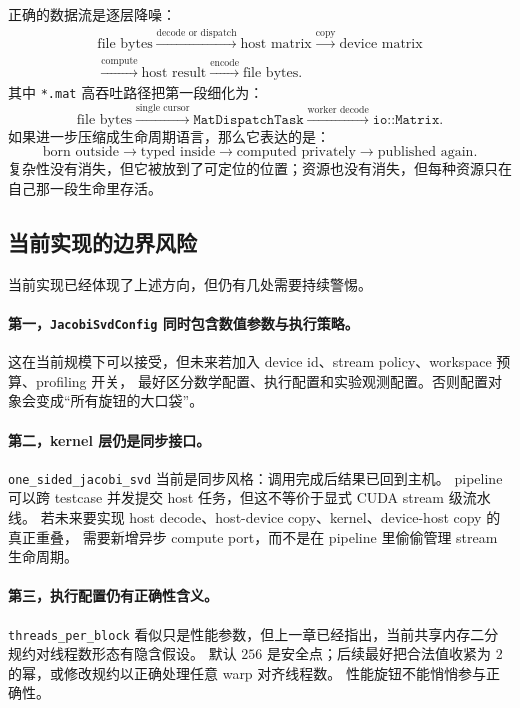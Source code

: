 正确的数据流是逐层降噪：
\[
    \begin{gathered}
        \text{file bytes}
        \xrightarrow{\text{decode or dispatch}}
        \text{host matrix}
        \xrightarrow{\text{copy}}
        \text{device matrix} \\
        \xrightarrow{\text{compute}}
        \text{host result}
        \xrightarrow{\text{encode}}
        \text{file bytes}.
    \end{gathered}
\]
其中 \texttt{*.mat} 高吞吐路径把第一段细化为：
\[
    \text{file bytes}
    \xrightarrow{\text{single cursor}}
    \texttt{MatDispatchTask}
    \xrightarrow{\text{worker decode}}
    \texttt{io::Matrix}.
\]
如果进一步压缩成生命周期语言，那么它表达的是：
\[
    \text{born outside}
    \rightarrow
    \text{typed inside}
    \rightarrow
    \text{computed privately}
    \rightarrow
    \text{published again}.
\]
复杂性没有消失，但它被放到了可定位的位置；资源也没有消失，但每种资源只在自己那一段生命里存活。

\subsection{当前实现的边界风险}

当前实现已经体现了上述方向，但仍有几处需要持续警惕。

\paragraph{第一，\texttt{JacobiSvdConfig} 同时包含数值参数与执行策略。}
这在当前规模下可以接受，但未来若加入 device id、stream policy、workspace 预算、profiling 开关，
最好区分数学配置、执行配置和实验观测配置。否则配置对象会变成“所有旋钮的大口袋”。

\paragraph{第二，kernel 层仍是同步接口。}
\texttt{one\_sided\_jacobi\_svd} 当前是同步风格：调用完成后结果已回到主机。
pipeline 可以跨 testcase 并发提交 host 任务，但这不等价于显式 CUDA stream 级流水线。
若未来要实现 host decode、host-device copy、kernel、device-host copy 的真正重叠，
需要新增异步 compute port，而不是在 pipeline 里偷偷管理 stream 生命周期。

\paragraph{第三，执行配置仍有正确性含义。}
\texttt{threads\_per\_block} 看似只是性能参数，但上一章已经指出，当前共享内存二分规约对线程数形态有隐含假设。
默认 \(256\) 是安全点；后续最好把合法值收紧为 \(2\) 的幂，或修改规约以正确处理任意 warp 对齐线程数。
性能旋钮不能悄悄参与正确性。


